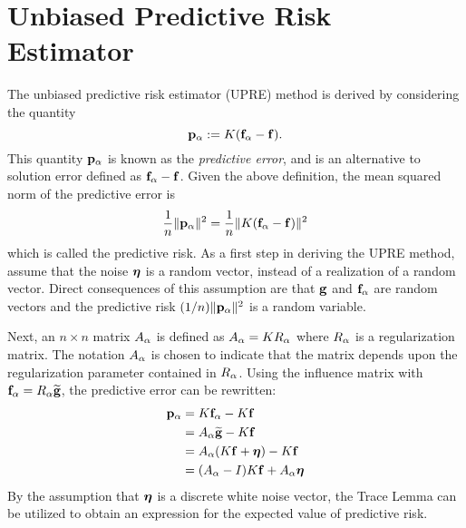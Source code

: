 \section{Unbiased Predictive Risk Estimator} \label{sec:Unbiased Predictive Risk Estimator}
The unbiased predictive risk estimator (UPRE) method \cite{Mallows1973} is derived by considering the quantity
\[\mathbf{p}_{\alpha} := K(\mathbf{f}_{\alpha} - \mathbf{f}).\]
This quantity $\mathbf{p}_{\alpha}$ is known as the \textit{predictive error}, and is an alternative to solution error defined as $\mathbf{f}_{\alpha} - \mathbf{f}$. Given the above definition, the mean squared norm of the predictive error is
\[\frac{1}{n}\|\mathbf{p}_{\alpha}\|^2 = \frac{1}{n}\|K(\mathbf{f}_{\alpha} - \mathbf{f})\|^2\]
which is called the predictive risk.  As a first step in deriving the UPRE method, assume that the noise $\bm{\eta}$ is a random vector, instead of a realization of a random vector. Direct consequences of this assumption are that $\mathbf{g}$ and $\mathbf{f}_{\alpha}$ are random vectors and the predictive risk $(1/n)\|\mathbf{p}_{\alpha}\|^2$ is a random variable. \par
Next, an $n \times n$ matrix $A_{\alpha}$ is defined as $A_{\alpha} = KR_{\alpha}$ where $R_{\alpha}$ is a regularization matrix. The notation $A_{\alpha}$ is chosen to indicate that the matrix depends upon the regularization parameter contained in $R_{\alpha}$. Using the influence matrix with $\mathbf{f}_{\alpha} = R_{\alpha}\widetilde{\mathbf{g}}$, the predictive error can be rewritten:
\begin{align*}
\mathbf{p}_{\alpha} &= K\mathbf{f}_{\alpha} - K\mathbf{f} \\
&= A_{\alpha}\widetilde{\mathbf{g}} - K\mathbf{f} \\
&= A_{\alpha}(K\mathbf{f} + \bm{\eta}) - K\mathbf{f} \\
&= (A_{\alpha} - I)K\mathbf{f} + A_{\alpha}\bm{\eta}
\end{align*}
By the assumption that $\bm{\eta}$ is a discrete white noise vector, the Trace Lemma can be utilized to obtain an expression for the expected value of predictive risk.

